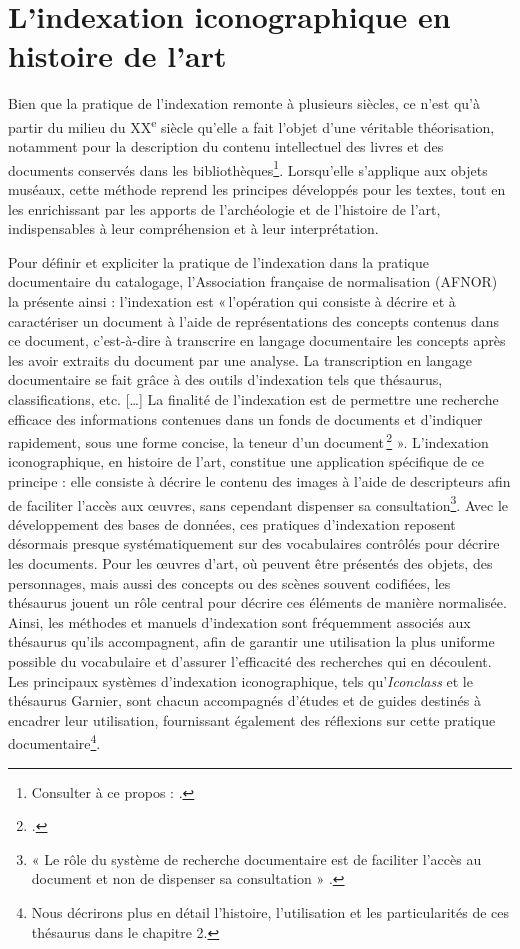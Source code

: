 \section{L'indexation iconographique en histoire de l’art}

Bien que la pratique de l’indexation remonte à plusieurs siècles, ce n’est qu’à partir du milieu du XX\textsuperscript{e} siècle qu’elle a fait l’objet d’une véritable théorisation, notamment pour la description du contenu intellectuel des livres et des documents conservés dans les bibliothèques\footnote{Consulter à ce propos : \cite{amarFondementsTheoriquesLindexation2000}.}. Lorsqu’elle s’applique aux objets muséaux, cette méthode reprend les principes développés pour les textes, tout en les enrichissant par les apports de l’archéologie et de l’histoire de l’art, indispensables à leur compréhension et à leur interprétation.

Pour définir et expliciter la pratique de l’indexation dans la pratique documentaire du catalogage, l'Association française de normalisation (AFNOR) la présente ainsi : l’indexation est « l’opération qui consiste à décrire et à caractériser un document à l’aide de représentations des concepts contenus dans ce document, c’est-à-dire à transcrire en langage documentaire les concepts après les avoir extraits du document par une analyse. La transcription en langage documentaire se fait grâce à des outils d’indexation tels que thésaurus, classifications, etc. […] La finalité de l’indexation est de permettre une recherche efficace des informations contenues dans un fonds de documents et d’indiquer rapidement, sous une forme concise, la teneur d’un document \footcite[norme NF Z47-102, vol. 1, p. 286]{associationfrancaisedenormalisationDocumentationRecueilNormes1993} ». L’indexation iconographique, en histoire de l’art, constitue une application spécifique de ce principe : elle consiste à décrire le contenu des images à l’aide de descripteurs afin de faciliter l’accès aux œuvres, sans cependant dispenser sa consultation\footnote{« Le rôle du système de recherche documentaire est de faciliter l’accès au document et non de dispenser sa consultation » \cite[p. 15]{garnierThesaurusIconographiqueSysteme1984}.}. Avec le développement des bases de données, ces pratiques d’indexation reposent désormais presque systématiquement sur des vocabulaires contrôlés pour décrire les documents. Pour les œuvres d'art, où peuvent être présentés des objets, des personnages, mais aussi des concepts ou des scènes souvent codifiées, les thésaurus jouent un rôle central pour décrire ces éléments de manière normalisée. Ainsi, les méthodes et manuels d’indexation sont fréquemment associés aux thésaurus qu’ils accompagnent, afin de garantir une utilisation la plus uniforme possible du vocabulaire et d'assurer l’efficacité des recherches qui en découlent. Les principaux systèmes d’indexation iconographique, tels qu’\textit{Iconclass} et le thésaurus Garnier, sont chacun accompagnés d’études et de guides destinés à encadrer leur utilisation, fournissant également des réflexions sur cette pratique documentaire\footnote{Nous décrirons plus en détail l'histoire, l'utilisation et les particularités de ces thésaurus dans le chapitre 2.}.

